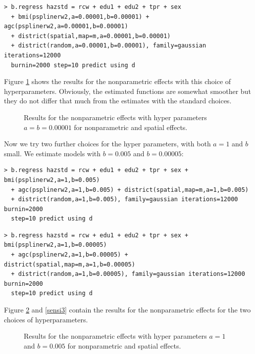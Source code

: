 \documentclass{article}
\begin{document}
\begin{verbatim}
> b.regress hazstd = rcw + edu1 + edu2 + tpr + sex
  + bmi(psplinerw2,a=0.00001,b=0.00001) + agc(psplinerw2,a=0.00001,b=0.00001)
  + district(spatial,map=m,a=0.00001,b=0.00001)
  + district(random,a=0.00001,b=0.00001), family=gaussian iterations=12000
  burnin=2000 step=10 predict using d
\end{verbatim}

Figure \ref{sensi1} shows the results for the nonparametric
effects with this choice of hyperparameters. Obviously, the
estimated functions are somewhat smoother but they do not differ
that much from the estimates with the standard choices.

\begin{figure}[ht]
\begin{center}
 {\it\caption{Results
for the nonparametric effects with hyper parameters $a=b=0.00001$
for nonparametric and spatial effects.\label{sensi1}}}
\end{center}
\end{figure}

Now we try two further choices for the hyper parameters, with both
$a=1$ and $b$ small. We estimate models with $b=0.005$ and
$b=0.00005$:

\begin{verbatim}
> b.regress hazstd = rcw + edu1 + edu2 + tpr + sex + bmi(psplinerw2,a=1,b=0.005)
  + agc(psplinerw2,a=1,b=0.005) + district(spatial,map=m,a=1,b=0.005)
  + district(random,a=1,b=0.005), family=gaussian iterations=12000 burnin=2000
  step=10 predict using d
\end{verbatim}

\begin{verbatim}
> b.regress hazstd = rcw + edu1 + edu2 + tpr + sex + bmi(psplinerw2,a=1,b=0.00005)
  + agc(psplinerw2,a=1,b=0.00005) + district(spatial,map=m,a=1,b=0.00005)
  + district(random,a=1,b=0.00005), family=gaussian iterations=12000 burnin=2000
  step=10 predict using d
\end{verbatim}

Figure \ref{sensi2} and \ref{sensi3} contain the results for the
nonparametric effects for the two choices of hyperparameters.

\begin{figure}[ht]
\begin{center}
 {\it\caption{Results
for the nonparametric effects with hyper parameters $a=1$ and
$b=0.005$ for nonparametric and spatial effects.\label{sensi2}}}
\end{center}
\end{figure}
\end{document}

